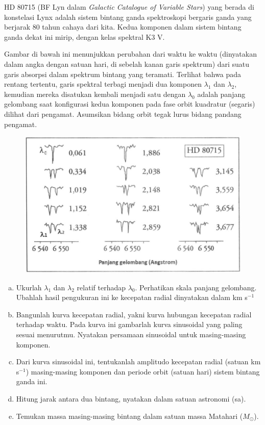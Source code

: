 \documentclass[11pt,fleqn]{exam}
\newcommand*{\kms}{km s\ensuremath{^{-1}}}
\begin{document}
\begin{questions}
\begin{enumerate}[a.]
\end{enumerate}


\vspace{0.5cm}
\question HD 80715 (BF Lyn dalam \textit{Galactic Catalogue of Variable Stars}) yang berada di konstelasi Lynx adalah sistem bintang ganda spektroskopi bergaris ganda yang berjarak 80 tahun cahaya dari kita. Kedua komponen dalam sistem bintang ganda dekat ini mirip, dengan kelas spektral K3 V.

Gambar di bawah ini menunjukkan perubahan dari waktu ke waktu (dinyatakan dalam angka dengan satuan hari, di sebelah kanan garis spektrum) dari suatu garis absorpsi dalam spektrum bintang yang teramati. Terlihat bahwa pada rentang tertentu, garis spektral terbagi menjadi dua komponen $\lambda_1$ dan $\lambda_2$, kemudian mereka disatukan kembali menjadi satu dengan $\lambda_0$ adalah panjang gelombang saat konfigurasi kedua komponen pada fase orbit kuadratur (segaris) dilihat dari pengamat. Asumsikan bidang orbit tegak lurus bidang pandang pengamat.

\begin{figure}[H]
	\centering
	\includegraphics[width=\textwidth]{HD80715.png}
	\label{fig:hd80715}
\end{figure}

\begin{enumerate}[a.]
	\item Ukurlah $\lambda_1$ dan $\lambda_2$ relatif terhadap $\lambda_0$. Perhatikan skala panjang gelombang. Ubahlah hasil pengukuran ini ke kecepatan radial dinyatakan dalam \kms
	\item Bangunlah kurva kecepatan radial, yakni kurva hubungan kecepatan radial terhadap waktu. Pada kurva ini gambarlah kurva sinusoidal yang paling sesuai menurutmu. Nyatakan persamaan sinusoidal untuk masing-masing komponen.
	\item Dari kurva sinusoidal ini, tentukanlah amplitudo kecepatan  radial (satuan \kms) masing-masing komponen dan periode orbit (satuan hari) sistem bintang ganda ini.
	\item Hitung jarak antara dua bintang, nyatakan dalam satuan astronomi (sa).
	\item Temukan massa masing-masing bintang dalam satuan massa Matahari ($M_\odot$).
\end{enumerate}


\end{questions}
\end{document}
